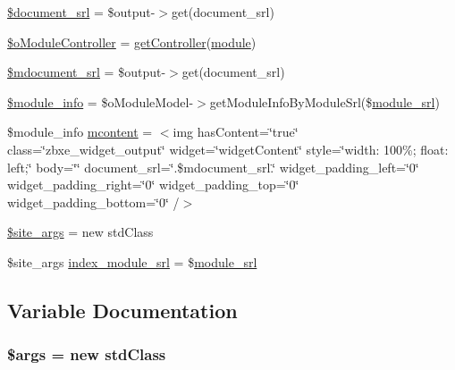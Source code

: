 \begin{DoxyCompactItemize}
\item 
\hyperlink{ko_8install_8php_a14522e7fff0604a8372c75b4a0fbc0fd}{\$document\+\_\+srl} = \$output-\/$>$get(\textquotesingle{}document\+\_\+srl\textquotesingle{})
\item 
\hyperlink{ko_8install_8php_aaae9128654f5054258982d94a0566987}{\$o\+Module\+Controller} = \hyperlink{func_8inc_8php_aa08f01e3bf130d770b373ca8493e3e9b}{get\+Controller}(\textquotesingle{}\hyperlink{classmodule}{module}\textquotesingle{})
\item 
\hyperlink{ko_8install_8php_a27c211d9a984964f84c8ffb6ea7328fc}{\$mdocument\+\_\+srl} = \$output-\/$>$get(\textquotesingle{}document\+\_\+srl\textquotesingle{})
\item 
\hyperlink{ko_8install_8php_a5e701819149f6ea0893d4b79010417d3}{\$module\+\_\+info} = \$o\+Module\+Model-\/$>$get\+Module\+Info\+By\+Module\+Srl(\$\hyperlink{ko_8install_8php_a370bb6450fab1da3e0ed9f484a38b761}{module\+\_\+srl})
\item 
\$module\+\_\+info \hyperlink{ko_8install_8php_a9da4bb6e77356bb68ae0e05dbd9f5e2f}{mcontent} = \textquotesingle{}$<$img has\+Content=\char`\"{}true\char`\"{} class=\char`\"{}zbxe\+\_\+widget\+\_\+output\char`\"{} widget=\char`\"{}widget\+Content\char`\"{} style=\char`\"{}width\+: 100\%; float\+: left;\char`\"{} body=\char`\"{}\char`\"{} document\+\_\+srl=\char`\"{}\textquotesingle{}.\$mdocument\+\_\+srl.\textquotesingle{}\char`\"{} widget\+\_\+padding\+\_\+left=\char`\"{}0\char`\"{} widget\+\_\+padding\+\_\+right=\char`\"{}0\char`\"{} widget\+\_\+padding\+\_\+top=\char`\"{}0\char`\"{} widget\+\_\+padding\+\_\+bottom=\char`\"{}0\char`\"{} /$>$\textquotesingle{}
\item 
\hyperlink{ko_8install_8php_a19e0fcfacd69155c9cc255e5500f6ccc}{\$site\+\_\+args} = new std\+Class
\item 
\$site\+\_\+args \hyperlink{ko_8install_8php_acd0b17bfe6d14c82871d73fa39c9c22d}{index\+\_\+module\+\_\+srl} = \$\hyperlink{ko_8install_8php_a370bb6450fab1da3e0ed9f484a38b761}{module\+\_\+srl}
\end{DoxyCompactItemize}


\subsection{Variable Documentation}
\hypertarget{ko_8install_8php_a67e94494731d99ed23b123e95175bc10}{}
\subsubsection[{\$args}]{\setlength{\rightskip}{0pt plus 5cm}\$args = new std\+Class}\label{ko_8install_8php_a67e94494731d99ed23b123e95175bc10}


